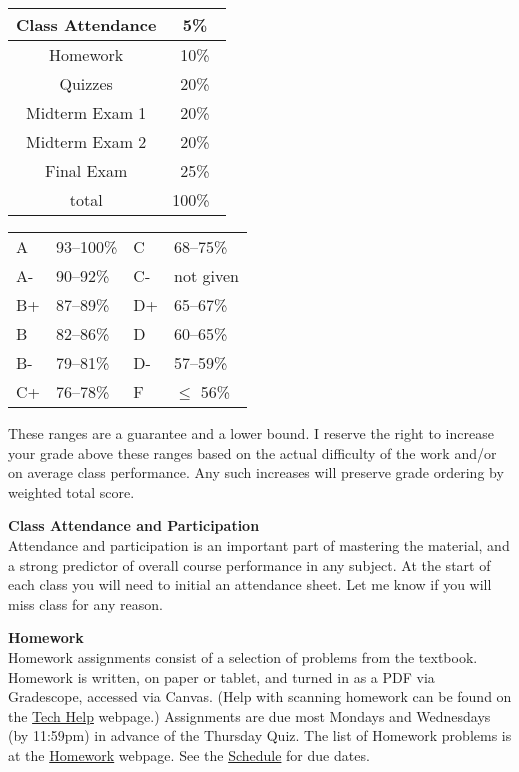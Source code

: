 \documentclass[12pt]{article}
\renewcommand{\emph}[1]{\textsf{\textbf{#1}}}
\newcommand{\localhead}[1]{\par\smallskip\textbf{#1} \smallskip\nobreak\\}%
\def\heading#1{\localhead{\large\emph{#1}}}
\begin{document}
\begin{multicols}{2}
\begin{tabular}{|c|c|}
\hline
Class Attendance & 5\%\\
\hline
Homework & 10\% \\
\hline
Quizzes & 20\% \\
\hline
Midterm Exam 1 & 20\% \\
\hline
Midterm Exam 2 & 20\%  \\
\hline
Final Exam & 25\% \\
\hline
total & 100\% \, \\
\hline
\end{tabular}


\begin{tabular}{llll}
A  & 93--100\%& C  & 68--75\%  \\
A- & 90--92\% & C- & not given \\
B+ & 87--89\% & D+ & 65--67\%  \\
B  & 82--86\% & D  & 60--65\%  \\
B- & 79--81\% & D- & 57--59\%  \\
C+ & 76--78\% & F  & $\le$ 56\%
\end{tabular}
\end{multicols}

These ranges are a guarantee and a lower bound. I reserve the right to increase your grade above these ranges based on the actual difficulty of the work and/or on average class performance. Any such increases will preserve grade ordering by weighted total score. 


\heading{Class Attendance and Participation}
Attendance and participation is an important part of mastering the material, and a strong predictor of overall course performance in any subject.  At the start of each class you will need to initial an attendance sheet.  Let me know if you will miss class for any reason.


\heading{Homework}
Homework assignments consist of a selection of problems from the textbook.  Homework is written, on paper or tablet, and turned in as a PDF via Gradescope, accessed via Canvas.  (Help with scanning homework can be found on the \href{https://uaf-math251.github.io/techHelp.html}{Tech Help} webpage.)  Assignments are due most Mondays and Wednesdays (by 11:59pm) in advance of the Thursday Quiz.  The list of Homework problems is at the \href{https://bueler.github.io/calc2/writtenhomework.html}{Homework} webpage.  See the \href{https://bueler.github.io/calc2/schedule.pdf}{Schedule} for due dates.
\end{document}
